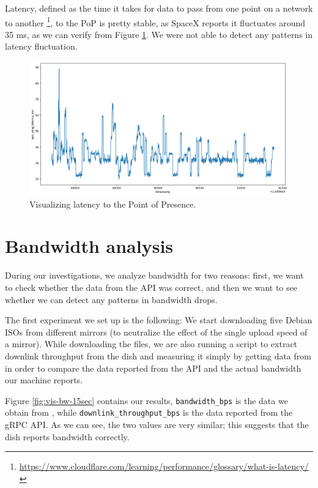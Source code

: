 \documentclass[IN,11pt,twoside,openright,idp,english]{tumthesis}
\begin{document}
Latency, defined as the time it takes for data to pass from one point on a network to another \footnote{\url{https://www.cloudflare.com/learning/performance/glossary/what-is-latency/}}, to the PoP is pretty stable, as SpaceX reports it fluctuates around 35 ms, as we can verify from Figure \ref{fig:vis-latency}. We were not able to detect any patterns in latency fluctuation.

\begin{figure}
    \centering
    \includegraphics[width=1\columnwidth]{img/latency.png}
    \caption{Visualizing latency to the Point of Presence.}
    \label{fig:vis-latency}
\end{figure}

\section{Bandwidth analysis}

During our investigations, we analyze bandwidth for two reasons: first, we want to check whether the data from the API was correct, and then we want to see whether we can detect any patterns in bandwidth drops.

The first experiment we set up is the following: We start downloading five Debian ISOs from different mirrors (to neutralize the effect of the single upload speed of a mirror). While downloading the files, we are also running a script to extract downlink throughput from the dish and measuring it simply by getting data from  in order to compare the data reported from the API and the actual bandwidth our machine reports.

Figure \ref{fig:vis-bw-15sec} contains our results, \texttt{bandwidth\_bps} is the data we obtain from , while \texttt{downlink\_throughput\_bps} is the data reported from the gRPC API. As we can see, the two values are very similar; this suggests that the dish reports bandwidth correctly.
\end{document}
